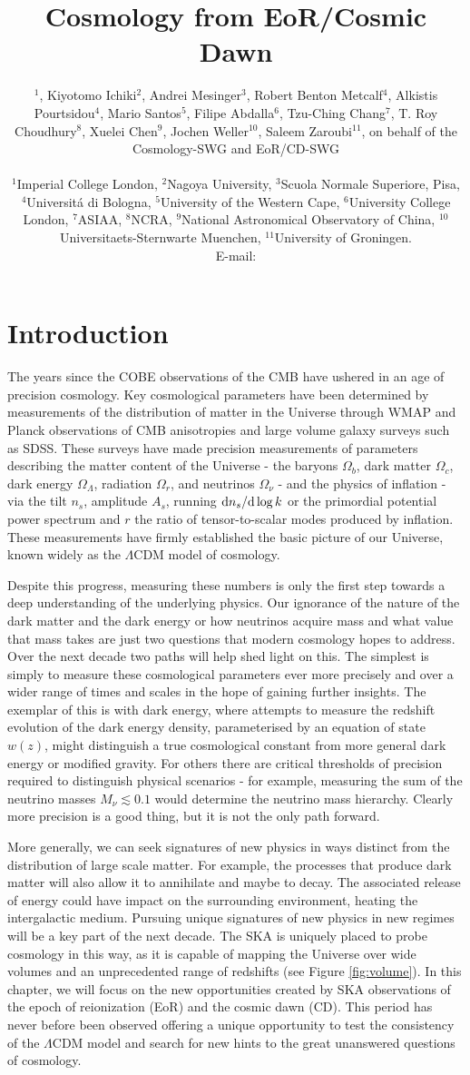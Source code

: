 \documentclass{PoS}
\title{Cosmology from EoR/Cosmic Dawn}
\author{\speaker{Jonathan Pritchard}$^1$, Kiyotomo Ichiki$^2$, Andrei Mesinger$^3$, Robert Benton Metcalf$^4$, Alkistis Pourtsidou$^4$, Mario Santos$^5$, Filipe Abdalla$^6$, Tzu-Ching Chang$^7$, T. Roy Choudhury$^8$, Xuelei Chen$^9$, Jochen Weller$^{10}$, Saleem Zaroubi$^{11}$,
on behalf of the Cosmology-SWG and EoR/CD-SWG


        

\\
        $^1$Imperial College London,
        $^2$Nagoya University,
        $^3$Scuola Normale Superiore, Pisa,
        $^4$Universit\'{a} di Bologna,
        $^5$University of the Western Cape,
        $^6$University College London,
        $^7$ASIAA,
        $^8$NCRA,
        $^9$National Astronomical Observatory of China,
        $^{10}$ Universitaets-Sternwarte Muenchen,
        $^{11}$University of Groningen.
        \\
        E-mail: \email{j.pritchard@imperial.ac.uk}}
\newcommand{\ud}{{\rm d}}
\begin{document}
\section{Introduction}

The years since the COBE observations of the CMB have ushered in an age of precision cosmology. Key cosmological parameters have been determined by measurements of the distribution of matter in the Universe through WMAP and Planck observations of CMB anisotropies and large volume galaxy surveys such as SDSS. These surveys have made precision measurements of parameters describing the matter content of the Universe - the baryons $\Omega_b$, dark matter $\Omega_c$, dark energy $\Omega_\Lambda$, radiation $\Omega_r$, and neutrinos $\Omega_\nu$ - and the physics of inflation - via the tilt $n_s$, amplitude $A_s$, running $\ud n_s/\ud\log k$ or the primordial potential power spectrum and $r$ the ratio of tensor-to-scalar modes produced by inflation. These measurements have firmly established the basic picture of our Universe, known widely as the $\Lambda$CDM model of cosmology.

Despite this progress, measuring these numbers is only the first step towards a deep understanding of the underlying physics. Our ignorance of the nature of the dark matter and the dark energy or how neutrinos acquire mass and what value that mass takes are just two questions that modern cosmology hopes to address. Over the next decade two paths will help shed light on this. The simplest is simply to measure these cosmological parameters ever more precisely and over a wider range of times and scales in the hope of gaining further insights. The exemplar of this is with dark energy, where attempts to measure the redshift evolution of the dark energy density, parameterised by an equation of state $w(z)$, might distinguish a true cosmological constant from more general dark energy or modified gravity. For others there are critical thresholds of precision required to distinguish physical scenarios - for example, measuring the sum of the neutrino masses $M_\nu\lesssim0.1$ would determine the neutrino mass hierarchy. Clearly more precision is a good thing, but it is not the only path forward.

More generally, we can seek signatures of new physics in ways distinct from the distribution of large scale matter. For example, the processes that produce dark matter will also allow it to annihilate and maybe to decay. The associated release of energy could have impact on the surrounding environment, heating the intergalactic medium. Pursuing unique signatures of new physics in new regimes will be a key part of the next decade.
The SKA is uniquely placed to probe cosmology in this way, as it is capable of mapping the Universe over wide volumes and an unprecedented range of redshifts (see Figure \ref{fig:volume}). In this chapter, we will focus on the new opportunities created by SKA observations of the epoch of reionization (EoR) and the cosmic dawn (CD). This period has never before been observed offering a unique opportunity to test the consistency of the $\Lambda$CDM model and search for new hints to the great unanswered questions of cosmology.
\end{document}
